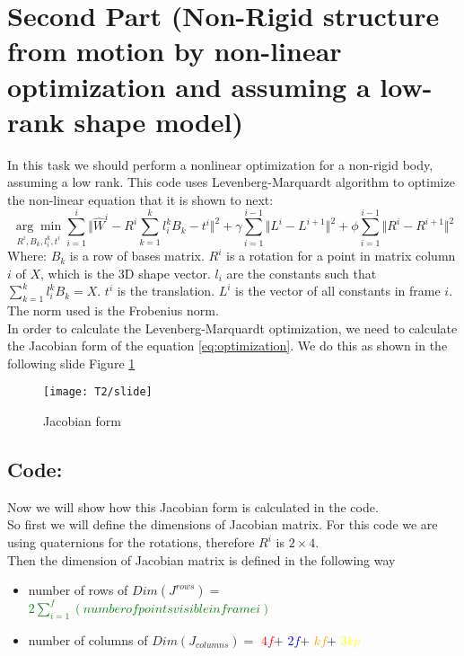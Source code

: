\section{Second Part (Non-Rigid structure from motion by non-linear optimization and assuming a low-rank shape model)}
\noindent In this task we should perform a nonlinear optimization for a non-rigid body, assuming a low rank. This code uses Levenberg-Marquardt algorithm to optimize the non-linear equation that it is shown to next:
\begin{equation}\label{eq:optimization}
	\underset{R^{i},B_{k},l_{i}^{k},t^{i}}{\arg\min}
	\sum_{i=1}^{i}\Vert \widehat{W}^{i}-R^{i}\sum_{k=1}^{k}l_{i}^{k}B_{k}-t^{i}\Vert^{2}+
	\gamma\sum_{i=1}^{i-1}\Vert L^{i}-L^{i+1} \Vert^{2}+
	\phi\sum_{i=1}^{i-1}\Vert R^{i}-R^{i+1} \Vert^{2}
\end{equation}
\noindent Where:
$B_{k}$ is a row of bases matrix.
$R^{i}$ is a rotation for a point in matrix column $i$ of $X$, which is the 3D shape vector. 
$l_{i}$ are the constants such that $\sum_{k=1}^{k}l_{i}^{k}B_{k}=X$.
$t^{i}$ is the translation.
$L^{i}$ is the vector of all constants in frame $i$.
\noindent The norm used is the Frobenius norm.\\

\noindent In order to calculate the Levenberg-Marquardt optimization, we need to calculate the Jacobian form of the equation \ref{eq:optimization}. We do this as shown in the following slide Figure \ref{fig:slideT2}

\begin{figure}[h]
	\centering
	\texttt{[image: T2/slide]}
	\caption{Jacobian form}
	\label{fig:slideT2}
\end{figure}

\subsection{Code:}
\noindent Now we will show how this Jacobian form is calculated in the code.\\

\noindent So first we will define the dimensions of Jacobian matrix. For this code we are using quaternions for the rotations, therefore $R^{i}$ is $2\times 4$.\\

\noindent Then the dimension of Jacobian matrix is defined in the following way

\begin{itemize}
	\item number of rows of $Dim(J^{rows})=$
	\textcolor{green}{$2\sum_{i=1}^{f}(number of points visible in frame i)$}
	\item number of columns of $Dim(J_{columns})=$
	\textcolor{red}{$4f$}$+$
	\textcolor{blue}{$2f$}$+$
	\textcolor{orange}{$kf$}$+$
	\textcolor{Yellow}{$3kp$}	
\end{itemize}

